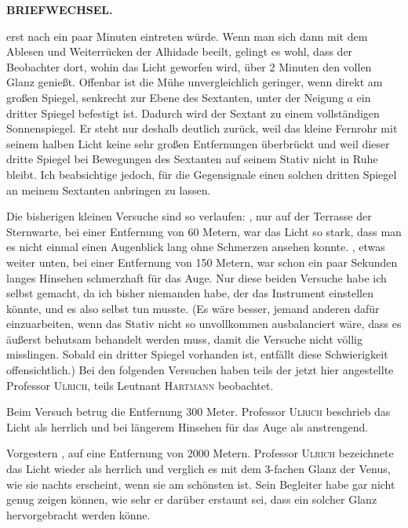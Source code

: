 \par\clearpage
\noindent{}\hfill{\small\textbf{BRIEFWECHSEL.}}\hfill\null\par\medskip
\noindent erst nach ein paar Minuten eintreten würde. Wenn man sich dann mit dem Ablesen und Weiterrücken der Alhidade beeilt, gelingt es wohl, dass der Beobachter dort, wohin das Licht geworfen wird, über 2 Minuten den vollen Glanz genießt. Offenbar ist die Mühe unvergleichlich geringer, wenn direkt am großen Spiegel, senkrecht zur Ebene des Sextanten, unter der Neigung $a$ ein dritter Spiegel befestigt ist. Dadurch wird der Sextant zu einem vollständigen Sonnenspiegel. Er steht nur deshalb deutlich zurück, weil das kleine Fernrohr mit seinem halben Licht keine sehr großen Entfernungen überbrückt und weil dieser dritte Spiegel bei Bewegungen des Sextanten auf seinem Stativ nicht in Ruhe bleibt. Ich beabsichtige jedoch, für die Gegensignale einen solchen dritten Spiegel an meinem Sextanten anbringen zu lassen.

\par\noindent\hspace*{\parindent}Die bisherigen kleinen Versuche sind so verlaufen: , nur auf der Terrasse der Sternwarte, bei einer Entfernung von 60 Metern, war das Licht so stark, dass man es nicht einmal einen Augenblick lang ohne Schmerzen ansehen konnte. , etwas weiter unten, bei einer Entfernung von 150 Metern, war schon ein paar Sekunden langes Hinsehen schmerzhaft für das Auge. Nur diese beiden Versuche habe ich selbst gemacht, da ich bisher niemanden habe, der das Instrument einstellen könnte, und es also selbst tun musste. (Es wäre besser, jemand anderen dafür einzuarbeiten, wenn das Stativ nicht so unvollkommen ausbalanciert wäre, dass es äußerst behutsam behandelt werden muss, damit die Versuche nicht völlig misslingen. Sobald ein dritter Spiegel vorhanden ist, entfällt diese Schwierigkeit offensichtlich.) Bei den folgenden Versuchen haben teils der jetzt hier angestellte Professor \textsc{Ulrich}, teils Leutnant \textsc{Hartmann} beobachtet.

\par\noindent\hspace*{\parindent}Beim  Versuch betrug die Entfernung 300 Meter. Professor \textsc{Ulrich} beschrieb das Licht als herrlich und bei längerem Hinsehen für das Auge als anstrengend.

\par\noindent\hspace*{\parindent}Vorgestern , auf eine Entfernung von 2000 Metern. Professor \textsc{Ulrich} bezeichnete das Licht wieder als herrlich und verglich es mit dem 3-fachen Glanz der Venus, wie sie nachts erscheint, wenn sie am schönsten ist. Sein Begleiter habe gar nicht genug zeigen können, wie sehr er darüber erstaunt sei, dass ein solcher Glanz hervorgebracht werden könne.

